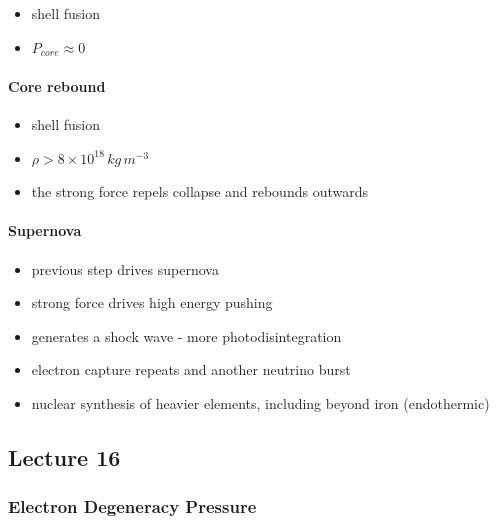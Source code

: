 \documentclass[a4paper,11pt,normalem]{article}
\begin{document}
\begin{itemize}
\item
  shell fusion
\item
  \(P_{core} \approx 0\)
\end{itemize}

\paragraph{Core rebound}\label{core-rebound}

\begin{itemize}
\item
  shell fusion
\item
  \(\rho > 8\times10^{18}\,kg\,m^{-3}\)
\item
  the strong force repels collapse and rebounds outwards
\end{itemize}

\paragraph{Supernova}\label{supernova}

\begin{itemize}
\item
  previous step drives supernova
\item
  strong force drives high energy pushing
\item
  generates a shock wave - more photodisintegration
\item
  electron capture repeats and another neutrino burst
\item
  nuclear synthesis of heavier elements, including beyond iron
  (endothermic)
\end{itemize}

\subsection{Lecture 16}\label{lecture-16}

\subsubsection{Electron Degeneracy
Pressure}\label{electron-degeneracy-pressure}
\end{document}
